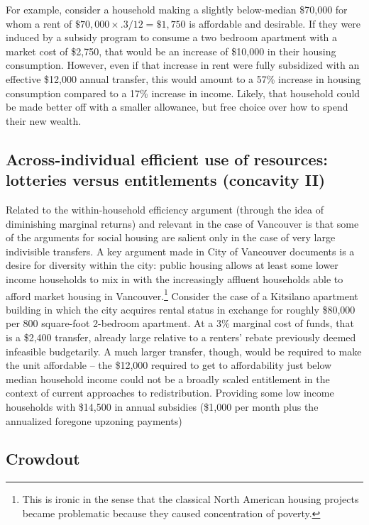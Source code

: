 \documentclass[12pt]{article}
\begin{document}
For example, consider a household making a slightly below-median \$70,000 for whom a rent of $\$70,000\times .3/12 = \$1,750 $ is affordable and desirable. If they were induced by a subsidy program to consume a two bedroom apartment with a market cost of \$2,750, that would be an increase of \$10,000 in their housing consumption. However, even if that increase in rent were fully subsidized with an effective \$12,000 annual transfer, this would amount to a 57\% increase in housing consumption compared to a 17\% increase in income. Likely, that household could be made better off with a smaller allowance, but free choice over how to spend their new wealth.

\subsection{Across-individual efficient use of resources: lotteries versus entitlements (concavity II)}

Related to the within-household efficiency argument (through the idea of diminishing marginal returns) and relevant in the case of Vancouver is that some of the arguments for social housing are salient only in the case of very large indivisible transfers. A key argument made in City of Vancouver documents is a desire for diversity within the city: public housing allows at least some lower income households to mix in with the increasingly affluent households able to afford market housing in Vancouver.\footnote{This is ironic in the sense that the classical North American housing projects became problematic because they caused concentration of poverty.} Consider the case of a Kitsilano apartment building in which the city acquires rental status in exchange for roughly \$80,000 per 800 square-foot 2-bedroom apartment. At a 3\% marginal cost of funds, that is a \$2,400 transfer, already large relative to a renters' rebate previously deemed infeasible budgetarily. A much larger transfer, though, would be required to make the unit affordable -- the \$12,000 required to get to affordability just below median household income could not be a broadly scaled entitlement in the context of current approaches to redistribution. Providing some low income households with \$14,500 in annual subsidies (\$1,000 per month plus the annualized foregone upzoning payments)

\subsection{Crowdout}
\end{document}
